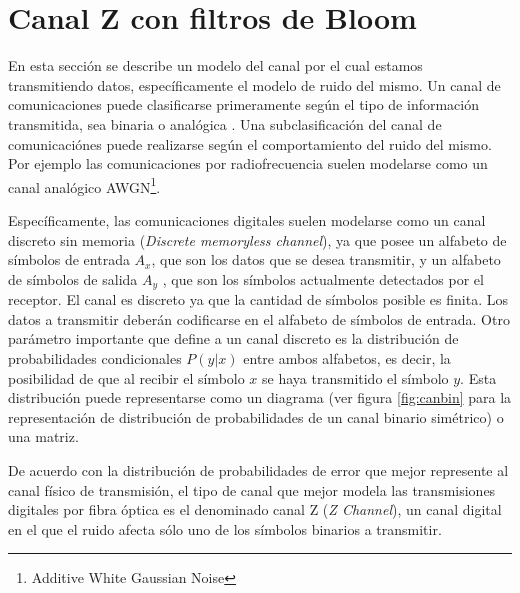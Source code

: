 % 

\section{Canal Z con filtros de Bloom}

En esta sección se describe un modelo del canal por el cual estamos transmitiendo datos, específicamente el modelo de ruido del mismo. 
Un canal de comunicaciones puede clasificarse primeramente según el tipo de información transmitida, sea binaria o analógica \cite{MacKay:2002}.
Una subclasificación del canal de comunicaciónes puede realizarse según el comportamiento del ruido del mismo.
Por ejemplo las comunicaciones por radiofrecuencia suelen modelarse como un canal analógico AWGN\footnote{Additive White Gaussian Noise}. 

Específicamente, las comunicaciones digitales suelen modelarse como un canal discreto sin memoria (\textit{Discrete memoryless channel}), ya que posee un alfabeto de símbolos de entrada $A_{x}$, que son los datos que se desea transmitir, y un alfabeto de símbolos de salida $A_{y}$ , que son los símbolos actualmente detectados por el receptor. El canal es discreto ya que la cantidad de símbolos posible es finita. Los datos a transmitir deberán codificarse en el alfabeto de símbolos de entrada.
Otro parámetro importante que define a un canal discreto es la distribución de probabilidades condicionales $P(y|x)$ entre ambos alfabetos, es decir, la posibilidad de que al recibir el símbolo $x$ se haya transmitido el símbolo $y$. Esta distribución puede representarse como un diagrama (ver figura \ref{fig:canbin} para la representación de distribución de probabilidades de un canal binario simétrico) o una matriz.

De acuerdo con la distribución de probabilidades de error que mejor represente al canal físico de transmisión, el tipo de canal que mejor modela las transmisiones digitales por fibra óptica es el denominado canal Z (\textit{Z Channel}), un canal digital en el que el ruido afecta sólo uno de los símbolos binarios a transmitir.

